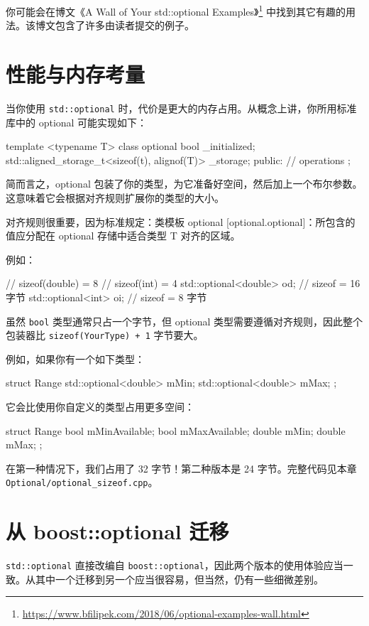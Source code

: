 你可能会在博文《A Wall of Your std::optional Examples》\footnote{\url{https://www.bfilipek.com/2018/06/optional-examples-wall.html}} 中找到其它有趣的用法。该博文包含了许多由读者提交的例子。

\section{性能与内存考量}
当你使用 \texttt{std::optional} 时，代价是更大的内存占用。从概念上讲，你所用标准库中的 optional 可能实现如下：

\begin{codebox}[cpp]
template <typename T>
class optional
{
bool _initialized;
std::aligned_storage_t<sizeof(t), alignof(T)> _storage;
public:
// operations
};
\end{codebox}

简而言之，optional 包装了你的类型，为它准备好空间，然后加上一个布尔参数。这意味着它会根据对齐规则扩展你的类型的大小。

对齐规则很重要，因为标准规定：类模板 optional [optional.optional]：所包含的值应分配在 optional 存储中适合类型 T 对齐的区域。

例如：

\begin{codebox}[cpp]
// sizeof(double) = 8
// sizeof(int) = 4
std::optional<double> od; // sizeof = 16 字节
std::optional<int> oi; // sizeof = 8 字节
\end{codebox}

虽然 \texttt{bool} 类型通常只占一个字节，但 optional 类型需要遵循对齐规则，因此整个包装器比 \texttt{sizeof(YourType) + 1} 字节要大。

例如，如果你有一个如下类型：

\begin{codebox}[cpp]
struct Range
{
std::optional<double> mMin;
std::optional<double> mMax;
};
\end{codebox}

它会比使用你自定义的类型占用更多空间：

\begin{codebox}[cpp]
struct Range
{
bool mMinAvailable;
bool mMaxAvailable;
double mMin;
double mMax;
};
\end{codebox}

在第一种情况下，我们占用了 32 字节！第二种版本是 24 字节。完整代码见本章 \texttt{Optional/optional\_sizeof.cpp}。

\section{从 boost::optional 迁移}
\texttt{std::optional} 直接改编自 \texttt{boost::optional}，因此两个版本的使用体验应当一致。从其中一个迁移到另一个应当很容易，但当然，仍有一些细微差别。

